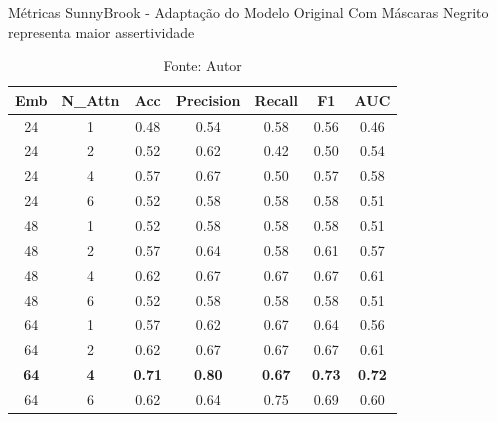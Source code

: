 \begin{table}[htbp]
\centering
\caption{Métricas SunnyBrook - Adaptação do Modelo Original Com Máscaras
\newline Negrito representa maior assertividade}
\begin{tabular}{ccccccc}
\toprule
\textbf{Emb} & \textbf{N\_Attn} & \textbf{Acc} & \textbf{Precision} & \textbf{Recall} & \textbf{F1} & \textbf{AUC} \\
\midrule
24 & 1 & 0.48 & 0.54 & 0.58 & 0.56 & 0.46 \\
24 & 2 & 0.52 & 0.62 & 0.42 & 0.50 & 0.54 \\
24 & 4 & 0.57 & 0.67 & 0.50 & 0.57 & 0.58 \\
24 & 6 & 0.52 & 0.58 & 0.58 & 0.58 & 0.51 \\
48 & 1 & 0.52 & 0.58 & 0.58 & 0.58 & 0.51 \\
48 & 2 & 0.57 & 0.64 & 0.58 & 0.61 & 0.57 \\
48 & 4 & 0.62 & 0.67 & 0.67 & 0.67 & 0.61 \\
48 & 6 & 0.52 & 0.58 & 0.58 & 0.58 & 0.51 \\
64 & 1 & 0.57 & 0.62 & 0.67 & 0.64 & 0.56 \\
64 & 2 & 0.62 & 0.67 & 0.67 & 0.67 & 0.61 \\
\textbf{64} & \textbf{4} & \textbf{0.71} & \textbf{0.80} & \textbf{0.67} & \textbf{0.73} & \textbf{0.72} \\
64 & 6 & 0.62 & 0.64 & 0.75 & 0.69 & 0.60 \\
\bottomrule
\end{tabular}
\caption*{Fonte: Autor}
\label{tab:metrics_sunny_orig_mask}
\end{table}


